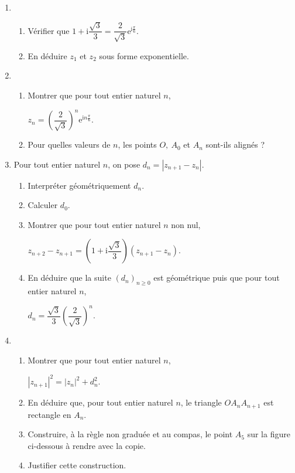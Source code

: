 \begin{enumerate}
     \item
     \begin{enumerate}[label=\alph*.]
          \item
          Vérifier que $1+\text{i}\dfrac{\sqrt{3}}{3} = \dfrac{2}{\sqrt{3}}\text{e}^{\text{i}\frac{\pi}{6}}$.
          \item
          En déduire $z_1$ et $z_2$ sous forme exponentielle.
     \end{enumerate}
     \item
     \begin{enumerate}[label=\alph*.]
          \item
          Montrer que pour tout entier naturel $n$,
          \begin{center}$z_n = \left(\dfrac{2}{\sqrt{3}} \right)^n \text{e}^{\text{i}n\frac{\pi}{6}}.$\end{center}
          \item
          Pour quelles valeurs de $n$, les points $O,~A_0$ et $A_n$ sont-ils alignés ?
     \end{enumerate}
     \item
     Pour tout entier naturel $n$, on pose $d_n = \left|z_{n+1}-z_n\right|$.
     \begin{enumerate}[label=\alph*.]
          \item
          Interpréter géométriquement $d_n$.
          \item
          Calculer $d_0$.
          \item
          Montrer que pour tout entier naturel $n$ non nul,
          \begin{center}$z_{n+2}-z_{n+1}  = \left(1+\text{i}\dfrac{\sqrt{3}}{3}\right) \left(z_{n+1}-z_n\right).$\end{center}
          \item
          En déduire que la suite $\left(d_n\right)_{n \geqslant 0}$  est géométrique puis que pour tout entier naturel $n$,
          \begin{center}$d_n = \dfrac{\sqrt{3}}{3}\left(\dfrac{2}{\sqrt{3}}\right)^n.$\end{center}
     \end{enumerate}
     \item
     \begin{enumerate}[label=\alph*.]
          \item
          Montrer que pour tout entier naturel $n$,
          \begin{center}$\left|z_{n+1}\right|^2  = \left|z_{n}\right|^2+d_n^2.$\end{center}
          \item
          En déduire que, pour tout entier naturel $n$, le triangle $OA_nA_{n+1}$ est rectangle en $A_n$.
          \item
          Construire, à la règle non graduée et au compas, le point $A_5$ sur la figure ci-dessous à rendre avec la copie.
          \item
          Justifier cette construction.
     \end{enumerate}
\end{enumerate}

